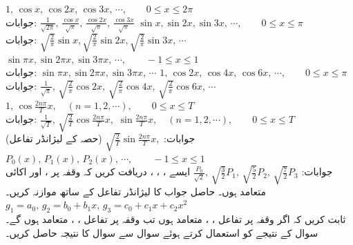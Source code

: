 \quad
$1,\, \cos x,\, \cos 2x,\, \cos 3x,\, \cdots,\quad \quad 0\le x\le 2\pi$\\
جوابات:
$\frac{1}{\sqrt{2\pi}},\, \frac{\cos x}{\sqrt{\pi}},\, \frac{\cos 2x}{\sqrt{\pi}},\, \frac{\cos 3x}{\sqrt{\pi}}$
\quad
$\sin x, \sin 2x, \sin 3x,\, \cdots,\quad \quad 0\le x\le \pi$\\
جوابات:
$\sqrt{\frac{2}{\pi}}\sin x, \sqrt{\frac{2}{\pi}}\sin 2x, \sqrt{\frac{2}{\pi}}\sin 3x,\, \cdots$
\quad
$\sin \pi x, \sin 2\pi x, \sin 3\pi x,\, \cdots,\quad \quad -1\le x\le 1$\\
جوابات:
$\sin \pi x, \sin 2\pi x, \sin 3\pi x,\, \cdots$
\quad
$1,\, \cos 2x,\, \cos 4x,\, \cos 6x,\, \cdots,\quad \quad 0\le x\le \pi$\\
جوابات:
$\frac{1}{\sqrt{\pi}},\, \sqrt{\frac{2}{\pi}}\cos 2x,\, \sqrt{\frac{2}{\pi}}\cos 4x,\, \sqrt{\frac{2}{\pi}}\cos 6x,\, \cdots$
\quad
$1,\, \cos \frac{2n\pi}{T}x, \quad (n=1,2,\cdots),\quad \quad 0\le x\le T$\\
جوابات:
$\frac{1}{\sqrt{T}},\, \sqrt{\frac{2}{T}}\cos \frac{2n\pi}{T}x, $
\quad
$\sin \frac{2n\pi}{T}x, \quad (n=1,2,\cdots),\quad \quad 0\le x\le T$\\
جوابات:
$\sqrt{\frac{2}{T}}\sin \frac{2n\pi}{T}x, $
\quad (حصہ  کے لیژانڈر تفاعل)
$P_0(x),\, P_1(x),\, P_2(x),\, \cdots,\quad \quad -1\le x\le 1$\\
جوابات:
$\frac{P_0}{\sqrt{2}},\, \sqrt{\frac{3}{2}}P_1,\,  \sqrt{\frac{5}{2}}P_2,\, \sqrt{\frac{7}{2}}P_3$
\quad ایسے ، ، ، دریافت کریں کہ  وقفہ  پر  ،  اور  اکائی متعامد ہوں۔ حاصل جواب کا لیژانڈر تفاعل کے ساتھ موازنہ کریں۔ \quad 
$g_1=a_0,\, g_2=b_0+b_1x,\, g_3=c_0+c_1x+c_2x^2$\\
ثابت کریں کہ اگر وقفہ  پر تفاعل ، ،  متعامد ہوں تب وقفہ  پر تفاعل ، ،  متعامد ہوں گے۔
سوال  کے نتیجے کو استعمال کرتے ہوئے سوال  سے سوال  کا نتیجہ حاصل کریں۔

